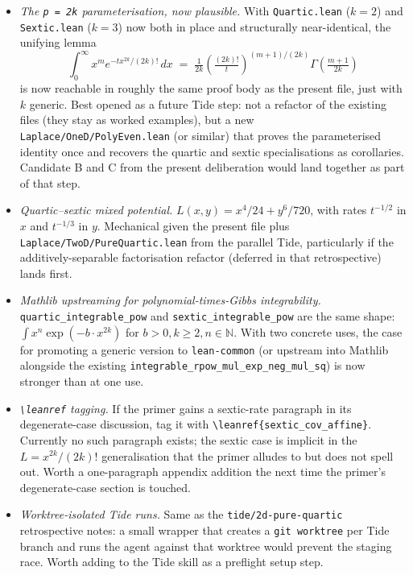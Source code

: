 \documentclass[11pt]{article}
\begin{document}
\begin{itemize}
\item \emph{The \texttt{p = 2k} parameterisation, now plausible.} With
\texttt{Quartic.lean} ($k=2$) and \texttt{Sextic.lean} ($k=3$) now both in
place and structurally near-identical, the unifying lemma
\[
  \int_0^\infty x^m e^{-t x^{2k}/(2k)!}\,dx
  \;=\; \tfrac{1}{2k} \left(\tfrac{(2k)!}{t}\right)^{(m+1)/(2k)}
        \Gamma\!\left(\tfrac{m+1}{2k}\right)
\]
is now reachable in roughly the same proof body as the present file, just
with $k$ generic. Best opened as a future Tide step: not a refactor of the
existing files (they stay as worked examples), but a new
\texttt{Laplace/OneD/PolyEven.lean} (or similar) that proves the parameterised
identity once and recovers the quartic and sextic specialisations as
corollaries. Candidate B and C from the present deliberation would land
together as part of that step.

\item \emph{Quartic--sextic mixed potential.} $L(x,y) = x^4/24 + y^6/720$,
with rates $t^{-1/2}$ in $x$ and $t^{-1/3}$ in $y$. Mechanical given the
present file plus \texttt{Laplace/TwoD/PureQuartic.lean} from the parallel
Tide, particularly if the additively-separable factorisation refactor
(deferred in that retrospective) lands first.

\item \emph{Mathlib upstreaming for polynomial-times-Gibbs integrability.}
\texttt{quartic\_integrable\_pow} and \texttt{sextic\_integrable\_pow} are
the same shape: $\int x^n \exp(-b \cdot x^{2k})$ for $b > 0, k \geq 2,
n \in \mathbb{N}$. With two concrete uses, the case for promoting a generic
version to \texttt{lean-common} (or upstream into Mathlib alongside the
existing \texttt{integrable\_rpow\_mul\_exp\_neg\_mul\_sq}) is now stronger
than at one use.

\item \emph{\texttt{\textbackslash leanref} tagging.} If the primer gains a
sextic-rate paragraph in its degenerate-case discussion, tag it with
\texttt{\textbackslash leanref\{sextic\_cov\_affine\}}. Currently no such
paragraph exists; the sextic case is implicit in the
$L = x^{2k}/(2k)!$ generalisation that the primer alludes to but does not
spell out. Worth a one-paragraph appendix addition the next time the
primer's degenerate-case section is touched.

\item \emph{Worktree-isolated Tide runs.} Same as the
\texttt{tide/2d-pure-quartic} retrospective notes: a small wrapper that
creates a \texttt{git worktree} per Tide branch and runs the agent against
that worktree would prevent the staging race. Worth adding to the Tide
skill as a preflight setup step.
\end{itemize}
\end{document}
